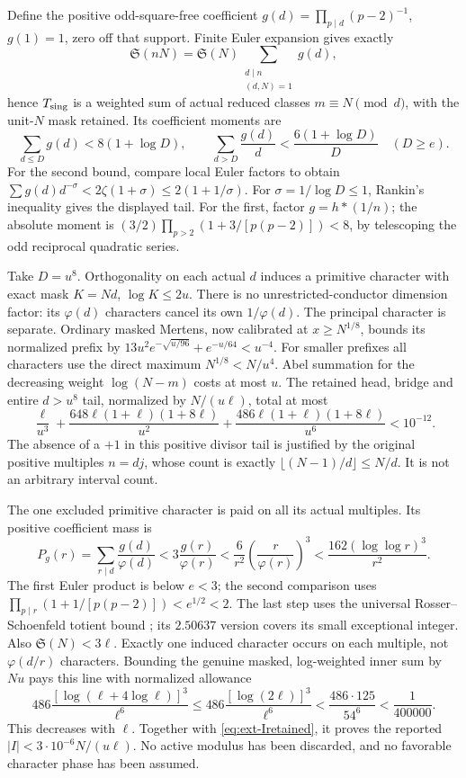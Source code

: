 \documentclass[11pt,a4paper]{article}
\theoremstyle{definition}
\theoremstyle{remark}
\begin{document}
Define the positive odd-square-free coefficient
$g(d)=\prod_{p\mid d}(p-2)^{-1}$, $g(1)=1$, zero off that support.
Finite Euler expansion gives exactly
\[
 \mathfrak S(nN)=\mathfrak S(N)
               \sum_{\substack{d\mid n\\(d,N)=1}}g(d),
\]
hence $T_{\rm sing}$ is a weighted sum of actual reduced classes
$m\equiv N\pmod d$, with the unit-$N$ mask retained.
Its coefficient moments are
\[
 \sum_{d\leq D}g(d)<8(1+\log D),\qquad
 \sum_{d>D}\frac{g(d)}d<\frac{6(1+\log D)}D\quad(D\geq e).
\]
For the second bound, compare local Euler factors to obtain
$\sum g(d)d^{-\sigma}<2\zeta(1+\sigma)\leq2(1+1/\sigma)$.
For $\sigma=1/\log D\leq1$, Rankin's inequality gives the displayed
tail. For the first, factor $g=h*(1/n)$; the absolute moment is
$(3/2)\prod_{p>2}(1+3/[p(p-2)])<8$, by telescoping the odd reciprocal
quadratic series.

Take $D=u^8$. Orthogonality on each actual $d$ induces a primitive
character with exact mask $K=Nd$, $\log K\leq2u$. There is no
unrestricted-conductor dimension factor: its $\varphi(d)$ characters
cancel its own $1/\varphi(d)$. The principal character is separate.
Ordinary masked Mertens, now calibrated at $x\geq N^{1/8}$, bounds
its normalized prefix by
$13u^2e^{-\sqrt{u/96}}+e^{-u/64}<u^{-4}$.
For smaller prefixes all characters use the direct maximum
$N^{1/8}<N/u^4$. Abel summation for the decreasing weight
$\log(N-m)$ costs at most $u$. The retained head, bridge and entire
$d>u^8$ tail, normalized by $N/(u\ell)$, total at most
\begin{equation}\label{eq:ext-Iretained}
 \frac\ell{u^3}
 +\frac{648\ell(1+\ell)(1+8\ell)}{u^2}
 +\frac{486\ell(1+\ell)(1+8\ell)}{u^6}<10^{-12}.
\end{equation}
The absence of a $+1$ in this positive divisor tail is justified
by the original positive multiples $n=dj$, whose count is exactly
$\lfloor(N-1)/d\rfloor\leq N/d$. It is not an arbitrary interval count.

The one excluded primitive character is paid on all its actual
multiples. Its positive coefficient mass is
\[
 P_g(r)=\sum_{r\mid d}\frac{g(d)}{\varphi(d)}
       <3\frac{g(r)}{\varphi(r)}
       <\frac6{r^2}\left(\frac r{\varphi(r)}\right)^3
       <\frac{162(\log\log r)^3}{r^2}.
\]
The first Euler product is below $e<3$; the second comparison uses
$\prod_{p\mid r}(1+1/[p(p-2)])<e^{1/2}<2$.
The last step uses the universal Rosser--Schoenfeld totient bound
\cite{RS}; its $2.50637$ version covers its small exceptional integer.
Also $\mathfrak S(N)<3\ell$. Exactly one induced character occurs
on each multiple, not $\varphi(d/r)$ characters.
Bounding the genuine masked, log-weighted inner sum by $Nu$ pays
this line with normalized allowance
\[
 486\frac{[\log(\ell+4\log\ell)]^3}{\ell^6}
 \leq486\frac{[\log(2\ell)]^3}{\ell^6}
 <\frac{486\cdot125}{54^6}<\frac1{400000}.
\]
This decreases with $\ell$. Together with \eqref{eq:ext-Iretained},
it proves the reported $|I|<3\cdot10^{-6}N/(u\ell)$.
No active modulus has been discarded, and no favorable character
phase has been assumed.
\end{document}
